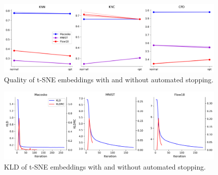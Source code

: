 \begin{figure}[h]
    \centering 
        \includegraphics[width=\linewidth]{../code/figures/opt-SNE_3_quality_measures.png}
        \caption{Quality of t-SNE embeddings with and without automated stopping.}
    \label{fig:opt-SNE_quality}
\end{figure}

\begin{figure}[h]
    \centering 
        \includegraphics[width=\linewidth]{../code/figures/opt-SNE_kl_divergences_plot.png}
        \caption{KLD of t-SNE embeddings with and without automated stopping.}
    \label{fig:opt-SNE_kld}
\end{figure}